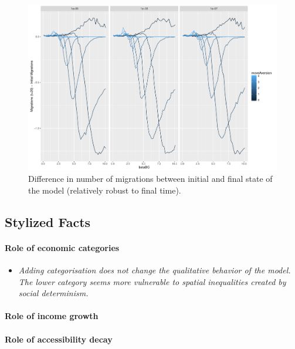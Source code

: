 \begin{figure}
\centering
\includegraphics[width=\textwidth,height=0.3\textheight]{figures/migr-diff-final}
\caption{Difference in number of migrations between initial and final state of the model (relatively robust to final time).}
\label{fig:migr-diff}
\end{figure}



\subsection{Stylized Facts}

\paragraph{Role of economic categories}

\begin{itemize}
\item \textit{Adding categorisation does not change the qualitative behavior of the model. The lower category seems more vulnerable to spatial inequalities created by social determinism.}
\end{itemize}

\paragraph{Role of income growth}


\paragraph{Role of accessibility decay}





